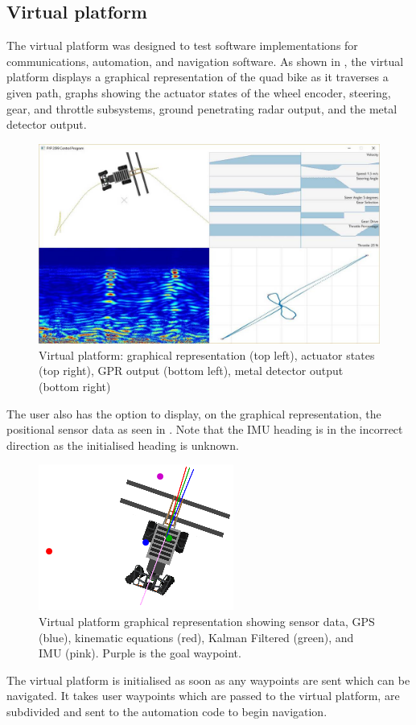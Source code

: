\documentclass[main.tex]{subfiles}
\begin{document}
\subsection{Virtual platform}
The virtual platform was designed to test software implementations for communications, automation, and navigation software. As shown in , the virtual platform displays a graphical representation of the quad bike as it traverses a given path, graphs showing the actuator states of the wheel encoder, steering, gear, and throttle subsystems, ground penetrating radar output, and the metal detector output.
\begin{figure}[ht]
\includegraphics[width=\textwidth]{4-DetailedDesign/virtualPlatform.jpg}
\centering
\caption[Virtual platform display window]{Virtual platform: graphical representation (top left), actuator states (top right), GPR output (bottom left), metal detector output (bottom right)} 
\end{figure}
The user also has the option to display, on the graphical representation, the positional sensor data as seen in . Note that the IMU heading is in the incorrect direction as the initialised heading is unknown.
\begin{figure}[!ht]
\includegraphics[]{4-DetailedDesign/dataVisibleVirtualPlatform.PNG}
\centering
\caption[Virtual platform graphical representation]{Virtual platform graphical representation showing sensor data, GPS (blue), kinematic equations (red), Kalman Filtered (green), and IMU (pink). Purple is the goal waypoint.} 
\end{figure}
The virtual platform is initialised as soon as any waypoints are sent which can be navigated. It takes user waypoints which are passed to the virtual platform, are subdivided and sent to the automation code to begin navigation.
\end{document}
